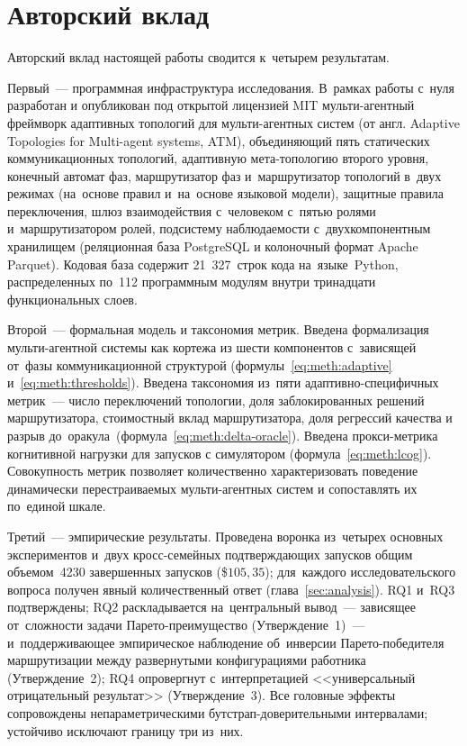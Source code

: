 
\section*{Авторский вклад}
\label{sec:contribution}

Авторский вклад настоящей работы сводится к~четырем результатам.

Первый~--- программная инфраструктура исследования. В~рамках работы
с~нуля разработан и опубликован под открытой лицензией MIT
мульти-агентный
фреймворк адаптивных топологий для мульти-агентных систем
(от англ. Adaptive Topologies for Multi-agent systems, ATM),
объединяющий пять статических коммуникационных топологий, адаптивную
мета-топологию второго уровня, конечный автомат фаз, маршрутизатор
фаз и~маршрутизатор топологий в~двух режимах (на~основе правил и~на~основе языковой модели),
защитные правила переключения, шлюз взаимодействия с~человеком
с~пятью ролями и~маршрутизатором ролей, подсистему
наблюдаемости с~двухкомпонентным хранилищем (реляционная база
PostgreSQL и колоночный формат Apache Parquet). Кодовая база
содержит 21~327~строк кода на~языке~Python, распределенных
по~112 программным модулям внутри тринадцати функциональных слоев.

Второй~--- формальная модель и таксономия метрик. Введена
формализация мульти-агентной системы как кортежа из шести
компонентов с~зависящей от~фазы коммуникационной структурой
(формулы~\ref{eq:meth:adaptive} и~\ref{eq:meth:thresholds}). Введена
таксономия из~пяти адаптивно-специфичных метрик~--- число
переключений топологии, доля заблокированных решений маршрутизатора,
стоимостный вклад маршрутизатора, доля регрессий качества и разрыв
до~оракула~(формула~\ref{eq:meth:delta-oracle}). Введена прокси-метрика
когнитивной нагрузки для запусков с симулятором
(формула~\ref{eq:meth:lcog}). Совокупность метрик позволяет
количественно характеризовать поведение динамически перестраиваемых
мульти-агентных систем и сопоставлять их по~единой шкале.

Третий~--- эмпирические результаты. Проведена воронка из~четырех
основных экспериментов и~двух кросс-семейных подтверждающих запусков
общим объемом~4230 завершенных запусков (\$$105{,}35$); для~каждого
исследовательского вопроса получен явный количественный ответ
(глава~\ref{sec:analysis}). RQ1 и~RQ3 подтверждены; RQ2 раскладывается на~центральный вывод~---
зависящее от~сложности задачи Парето-преимущество (Утверждение~1)~---
и~поддерживающее эмпирическое наблюдение об~инверсии Парето-победителя
маршрутизации между развернутыми конфигурациями работника
(Утверждение~2); RQ4 опровергнут с~интерпретацией
<<универсальный отрицательный результат>> (Утверждение~3). Все головные
эффекты сопровождены непараметрическими бутстрап-доверительными
интервалами; устойчиво исключают границу три из~них.

